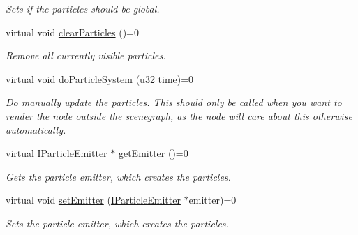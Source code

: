 \begin{DoxyCompactItemize}
\begin{DoxyCompactList}\small\item\em Sets if the particles should be global. \end{DoxyCompactList}\item 
\mbox{\label{classirr_1_1scene_1_1IParticleSystemSceneNode_aaebda202df3c76911773ebf80ed9e393}} 
virtual void \hyperlink{classirr_1_1scene_1_1IParticleSystemSceneNode_aaebda202df3c76911773ebf80ed9e393}{clear\+Particles} ()=0
\begin{DoxyCompactList}\small\item\em Remove all currently visible particles. \end{DoxyCompactList}\item 
\mbox{\label{classirr_1_1scene_1_1IParticleSystemSceneNode_aac6245c300b7226cb2b911b0ea642cec}} 
virtual void \hyperlink{classirr_1_1scene_1_1IParticleSystemSceneNode_aac6245c300b7226cb2b911b0ea642cec}{do\+Particle\+System} (\hyperlink{namespaceirr_a0416a53257075833e7002efd0a18e804}{u32} time)=0
\begin{DoxyCompactList}\small\item\em Do manually update the particles. This should only be called when you want to render the node outside the scenegraph, as the node will care about this otherwise automatically. \end{DoxyCompactList}\item 
virtual \hyperlink{classirr_1_1scene_1_1IParticleEmitter}{I\+Particle\+Emitter} $\ast$ \hyperlink{classirr_1_1scene_1_1IParticleSystemSceneNode_a2f1a12f030ad5aadfd8d1be24021c7d5}{get\+Emitter} ()=0
\begin{DoxyCompactList}\small\item\em Gets the particle emitter, which creates the particles. \end{DoxyCompactList}\item 
virtual void \hyperlink{classirr_1_1scene_1_1IParticleSystemSceneNode_aececff4531482ce976f1859c40bf3f76}{set\+Emitter} (\hyperlink{classirr_1_1scene_1_1IParticleEmitter}{I\+Particle\+Emitter} $\ast$emitter)=0
\begin{DoxyCompactList}\small\item\em Sets the particle emitter, which creates the particles. \end{DoxyCompactList}\item 

\end{DoxyCompactItemize}
